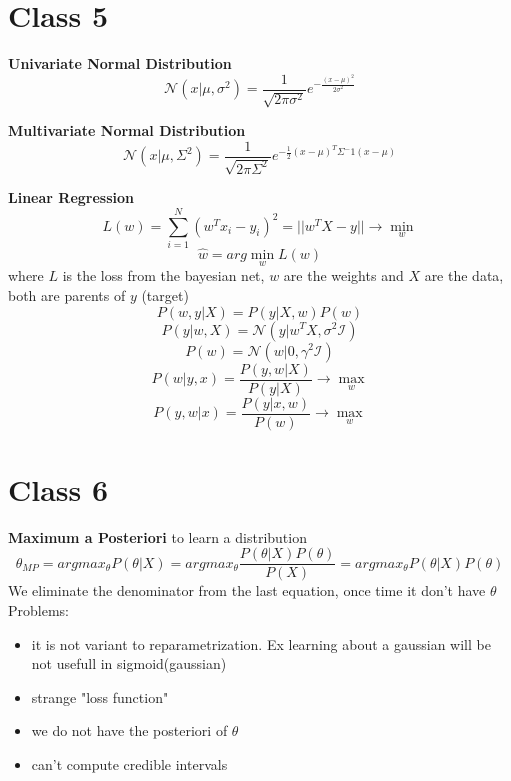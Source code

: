 \documentclass{article}
\begin{document}
\section{Class 5}
\textbf{Univariate Normal Distribution}
\begin{equation}
	\mathcal{N}(x|\mu, \sigma^2) = \frac{1}{\sqrt{2\pi\sigma^2}} e^{-\frac{(x - \mu)^2}{2\sigma^2}}    
\end{equation}
	
\textbf{Multivariate Normal Distribution}
\begin{equation}
    \mathcal{N}(x|\mu, \Sigma^2) = \frac{1}{\sqrt{2\pi\Sigma^2}} e^{-\frac{1}{2}(x - \mu)^T\Sigma^-1(x - \mu)}    
\end{equation}
		
\textbf{Linear Regression}
\begin{equation}
    L(w) = \sum_{i=1}^{N} (w^T x_i - y_i)^2 = ||w^T X - y|| \rightarrow \min_w
\end{equation}
\begin{equation}
    \hat{w} = arg \min_{w} L(w) 
\end{equation}
where $L$ is the loss from the bayesian net, $w$ are the weights and $X$ are the data, both are parents of $y$ (target)
\begin{equation}
    P(w, y|X) = P(y|X, w)P(w)
\end{equation}
\begin{equation}
    P(y|w, X) = \mathcal{N}(y|w^TX, \sigma^2\mathcal{I})
\end{equation}
\begin{equation}
    P(w) = \mathcal{N}(w|0, \gamma^2\mathcal{I}) 
\end{equation}
\begin{equation}
    P(w| y, x) = \frac{P(y, w|X)}{P(y|X)} \rightarrow \max_w
\end{equation}
\begin{equation}
    P(y, w|x) = \frac{P(y|x, w)}{P(w)} \rightarrow \max_w
\end{equation}

\section{Class 6}
\textbf{Maximum a Posteriori} to learn a distribution
\begin{equation}
    \theta_{MP} = arg max_\theta P(\theta|X) = arg max_\theta \frac{P(\theta|X)P(\theta)}{P(X)} = arg max_\theta P(\theta|X)P(\theta)    
\end{equation}	
We eliminate the denominator from the last equation, once time it don't have $\theta$
Problems: \begin{itemize}
    \item it is not variant to reparametrization. Ex learning about a gaussian will be not usefull in sigmoid(gaussian)
	\item strange "loss function"
	\item we do not have the posteriori of $\theta$
	\item can't compute credible intervals
\end{itemize}		
			
\end{document}
